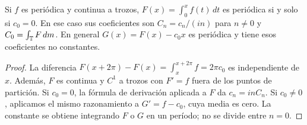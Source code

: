 \begin{proposicion}
Si $f$ es periódica y continua a trozos, $F(x)=\int_0^xf(t)\,dt$ es periódica si y solo si $c_0=0$. En ese caso sus coeficientes son $C_n=c_n/(in)$ para $n\ne0$ y $C_0=\int_\mathbb T F\,dm$. En general $G(x)=F(x)-c_0x$ es periódica y tiene esos coeficientes no constantes.
\end{proposicion}
\begin{proof}
La diferencia $F(x+2\pi)-F(x)=\int_x^{x+2\pi}f=2\pi c_0$ es independiente de $x$. Además, $F$ es continua y $C^1$ a trozos con $F'=f$ fuera de los puntos de partición. Si $c_0=0$, la fórmula de derivación aplicada a $F$ da $c_n=inC_n$. Si $c_0\ne0$, aplicamos el mismo razonamiento a $G'=f-c_0$, cuya media es cero. La constante se obtiene integrando $F$ o $G$ en un período; no se divide entre $n=0$.
\end{proof}

